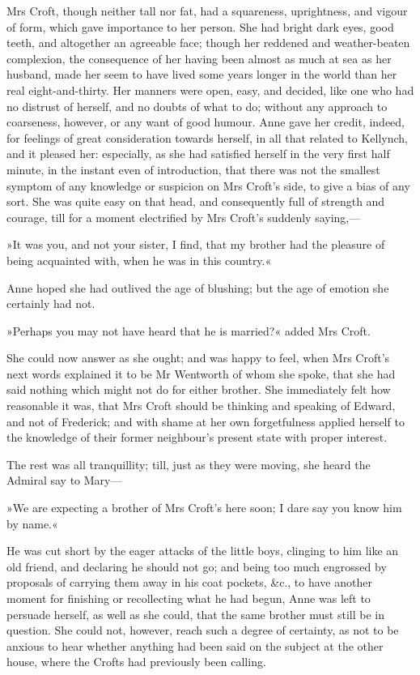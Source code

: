 Mrs Croft, though neither tall nor fat, had a squareness, uprightness, and vigour of form, which gave importance to her person. She had bright dark eyes, good teeth, and altogether an agreeable face; though her reddened and weather-beaten complexion, the consequence of her having been almost as much at sea as her husband, made her seem to have lived some years longer in the world than her real eight-and-thirty. Her manners were open, easy, and decided, like one who had no distrust of herself, and no doubts of what to do; without any approach to coarseness, however, or any want of good humour. Anne gave her credit, indeed, for feelings of great consideration towards herself, in all that related to Kellynch, and it pleased her: especially, as she had satisfied herself in the very first half minute, in the instant even of introduction, that there was not the smallest symptom of any knowledge or suspicion on Mrs Croft's side, to give a bias of any sort. She was quite easy on that head, and consequently full of strength and courage, till for a moment electrified by Mrs Croft's suddenly saying,—

»It was you, and not your sister, I find, that my brother had the pleasure of being acquainted with, when he was in this country.«

Anne hoped she had outlived the age of blushing; but the age of emotion she certainly had not.

»Perhaps you may not have heard that he is married?« added Mrs Croft.

She could now answer as she ought; and was happy to feel, when Mrs Croft's next words explained it to be Mr Wentworth of whom she spoke, that she had said nothing which might not do for either brother. She immediately felt how reasonable it was, that Mrs Croft should be thinking and speaking of Edward, and not of Frederick; and with shame at her own forgetfulness applied herself to the knowledge of their former neighbour's present state with proper interest.

The rest was all tranquillity; till, just as they were moving, she heard the Admiral say to Mary—

»We are expecting a brother of Mrs Croft's here soon; I dare say you know him by name.«

He was cut short by the eager attacks of the little boys, clinging to him like an old friend, and declaring he should not go; and being too much engrossed by proposals of carrying them away in his coat pockets, \&c., to have another moment for finishing or recollecting what he had begun, Anne was left to persuade herself, as well as she could, that the same brother must still be in question. She could not, however, reach such a degree of certainty, as not to be anxious to hear whether anything had been said on the subject at the other house, where the Crofts had previously been calling.


